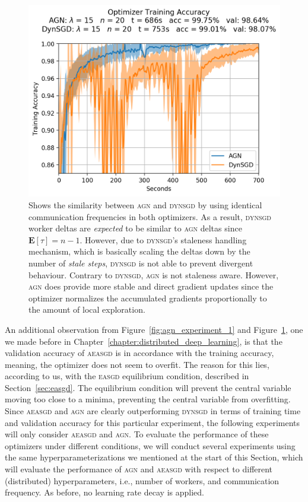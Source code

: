 \begin{figure}[H]
  \centering
  \includegraphics[width=.6\textwidth]{resources/images/agn_experiment_3}
  \caption{Shows the similarity between \textsc{agn} and \textsc{dynsgd} by using identical communication frequencies in both optimizers. As a result, \textsc{dynsgd} worker deltas are \emph{expected} to be similar to \textsc{agn} deltas since $\textbf{E}[\tau] = n - 1$. However, due to \textsc{dynsgd}'s staleness handling mechanism, which is basically scaling the deltas down by the number of \emph{stale steps}, \textsc{dynsgd} is not able to prevent divergent behaviour. Contrary to \textsc{dynsgd}, \textsc{agn} is not staleness aware. However, \textsc{agn} does provide more stable and direct gradient updates since the optimizer normalizes the accumulated gradients proportionally to the amount of local exploration.}
  \label{fig:agn_experiment_2}
\end{figure}

An additional observation from Figure~\ref{fig:agn_experiment_1} and Figure~\ref{fig:agn_experiment_2}, one we made before in Chapter~\ref{chapter:distributed_deep_learning}, is that the validation accuracy of \textsc{aeasgd} is in accordance with the training accuracy, meaning, the optimizer does not seem to overfit. The reason for this lies, according to us, with the \textsc{easgd} equilibrium condition, described in Section~\ref{sec:easgd}. The equilibrium condition will prevent the central variable moving too close to a minima, preventing the central variable from overfitting. Since \textsc{aeasgd} and \textsc{agn} are clearly outperforming \textsc{dynsgd} in terms of training time and validation accuracy for this particular experiment, the following experiments will only consider \textsc{aeasgd} and \textsc{agn}. To evaluate the performance of these optimizers under different conditions, we will conduct several experiments using the same hyperparameterizations we mentioned at the start of this Section, which will evaluate the performance of \textsc{agn} and \textsc{aeasgd} with respect to different (distributed) hyperparameters, i.e., number of workers, and communication frequency. As before, no learning rate decay is applied.\\

